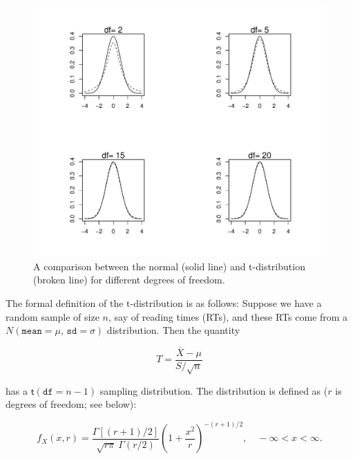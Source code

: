 \documentclass[12pt]{book}\usepackage[]{graphicx}\usepackage[]{color}
\makeatletter
\def\maxwidth{ %
  \ifdim\Gin@nat@width>\linewidth
    \linewidth
  \else
    \Gin@nat@width
  \fi
}
\newenvironment{knitrout}{}{} %
\makeatother
\begin{document}
\begin{figure}[!htbp]
  \centering
\begin{knitrout}
\color{fgcolor}
\includegraphics[width=\maxwidth]{figure/unnamed-chunk-28-1} 

\end{knitrout}
  
  \caption{A comparison between the normal (solid line) and t-distribution (broken line) for different degrees of freedom.}
  \label{fig:tversusnorm}
\end{figure}


The formal definition of the t-distribution is as follows:
Suppose we have a random sample of size $n$, say of reading times (RTs), and these RTs come from a $N(\mathtt{mean}=\mu,\,\mathtt{sd}=\sigma)$ distribution. Then the quantity 

\begin{equation}
T=\frac{\overline{X}-\mu}{S/\sqrt{n}}
\end{equation}

has a $\mathsf{t}(\mathtt{df}=n-1)$ sampling distribution. The distribution is defined as ($r$ is degrees of freedom; see below):

\begin{equation}
f_{X}(x,r)=\frac{\Gamma[(r+1)/2]}{\sqrt{r\pi}\ \Gamma(r/2)}\left(1+\frac{x^{2}}{r}\right)^{-(r+1)/2},\quad -\infty < x < \infty.
\end{equation}
\end{document}
